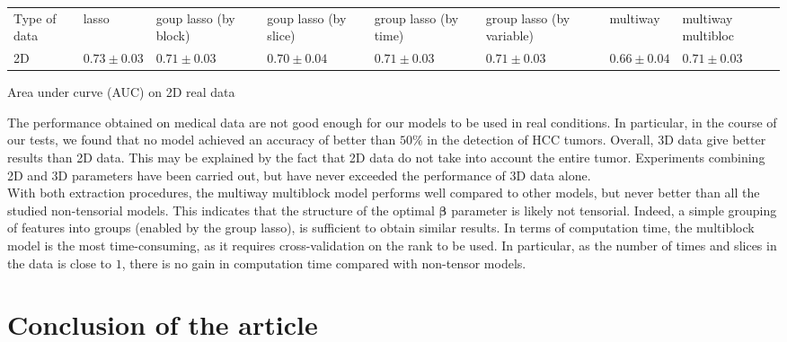 \documentclass[preprint,12pt]{elsarticle}
\begin{document}
\begin{table}[tbp]
\begin{adjustbox}{center}
\begin{tabular}{|>{\centering\arraybackslash}m{2cm}|>{\centering\arraybackslash}m{2cm}|>{\centering\arraybackslash}m{2cm}|>{\centering\arraybackslash}m{2cm}|>{\centering\arraybackslash}m{2.5cm}|>{\centering\arraybackslash}m{2.5cm}|>{\centering\arraybackslash}m{2cm}|>{\centering\arraybackslash}m{2cm}|}
    \cline{1-8}
    Type of data & lasso & goup lasso (by block) & goup lasso (by slice)& group lasso (by time)& group lasso (by variable) & multiway & multiway multibloc\\
    \cline{1-8} 
    2D & $0.73 \pm 0.03$ & $0.71 \pm 0.03$ & $0.70 \pm 0.04$ & $0.71 \pm 0.03 $  & $0.71 \pm 0.03$ & $0.66 \pm 0.04$ & $0.71 \pm 0.03$ \\
    \cline{1-8}
\end{tabular}
\end{adjustbox}
\parbox{0.9\textwidth}{
\vspace{0.2 cm}    
\centering \small Area under curve (AUC) on 2D real data}
\end{table}
The performance obtained on medical data are not good enough for our models to be used in real conditions. In particular, in the course of our tests, we found that no model achieved an accuracy of better than $50\%$ in the detection of HCC tumors. Overall, 3D data give better results than 2D data. This may be explained by the fact that 2D data do not take into account the entire tumor. Experiments combining 2D and 3D parameters have been carried out, but have never exceeded the performance of 3D data alone.\\
\indent With both extraction procedures, the multiway multiblock model performs well compared to other models, but never better than all the studied non-tensorial models. This indicates that the structure of the optimal $\bm{\beta}$ parameter is likely not tensorial. Indeed, a simple grouping of features into groups (enabled by the group lasso), is sufficient to obtain similar results. In terms of computation time, the multiblock model is the most time-consuming, as it requires cross-validation on the rank to be used. In particular, as the number of times and slices in the data is close to $1$, there is no gain in computation time compared with non-tensor models.\\


\section{Conclusion of the article}
\end{document}
